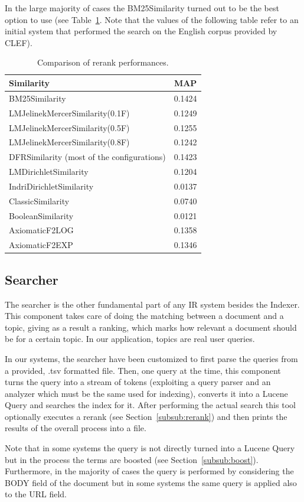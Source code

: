 In the large majority of cases the BM25Similarity turned out to be the best option to use (see Table~\ref{tab:similcomp}. Note that the values of the following table refer to an initial system that performed the search on the English corpus provided by CLEF).
\begin{center}
\begin{table}[tb]
\centering
\begin{tabular}{|l|c|} 
 \hline
    \textbf{Similarity} &  \textbf{MAP}  \\
 \hline\hline
 BM25Similarity & 0.1424  \\ 
 LMJelinekMercerSimilarity(0.1F) & 0.1249   \\
 LMJelinekMercerSimilarity(0.5F) & 0.1255  \\
 LMJelinekMercerSimilarity(0.8F) & 0.1242  \\ 
 DFRSimilarity (most of the configurations)& 0.1423\\
 LMDirichletSimilarity & 0.1204\\
 IndriDirichletSimilarity & 0.0137 \\
 ClassicSimilarity & 0.0740\\
 BooleanSimilarity & 0.0121 \\
 AxiomaticF2LOG & 0.1358 \\
 AxiomaticF2EXP & 0.1346\\
 \hline
\end{tabular}
\caption{Comparison of rerank performances.}
\label{tab:similcomp}
\end{table}
\end{center}

\subsection{Searcher}
\label{subsec:searcher}
The searcher is the other fundamental part of any IR system besides the Indexer. This component takes care of doing the matching between a document and a topic, giving as a result a ranking, which marks how relevant a document should be for a certain topic. In our application, topics are real user queries.
\par
In our systems, the searcher have been customized to first parse the queries from a provided, .tsv formatted file. Then, one query at the time, this component turns the query into a stream of tokens (exploiting a query parser and an analyzer which must be the same used for indexing), converts it into a Lucene Query and searches the index for it. After performing the actual search this tool optionally executes a rerank (see Section~\ref{subsub:rerank}) and then prints the results of the overall process into a file.
\par
Note that in some systems the query is not directly turned into a Lucene Query but in the process the terms are boosted (see Section~\ref{subsub:boost}). Furthermore, in the majority of cases the query is performed by considering the BODY field of the document but in some systems the same query is applied also to the URL field.

